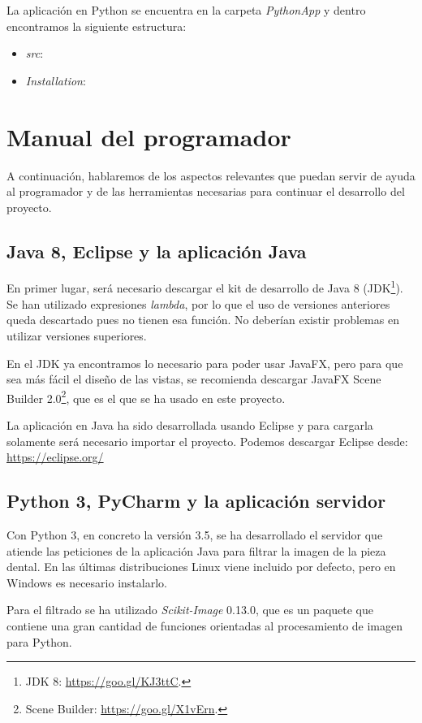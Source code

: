La aplicación en Python se encuentra en la carpeta \textit{PythonApp} y dentro encontramos la siguiente estructura:
\begin{itemize}
    \item \textit{src}:
    \item \textit{Installation}:
\end{itemize}

\section{Manual del programador}
A continuación, hablaremos de los aspectos relevantes que puedan servir de ayuda al programador y de las herramientas necesarias para continuar el desarrollo del proyecto.

\subsection{Java 8, Eclipse y la aplicación Java}
En primer lugar, será necesario descargar el kit de desarrollo de Java 8 (JDK\footnote{JDK 8: \url{https://goo.gl/KJ3ttC}.}). Se han utilizado expresiones \textit{lambda}, por lo que el uso de versiones anteriores queda descartado pues no tienen esa función. No deberían existir problemas en utilizar versiones superiores. 

En el JDK ya encontramos lo necesario para poder usar JavaFX, pero para que sea más fácil el diseño de las vistas, se recomienda descargar JavaFX Scene Builder 2.0\footnote{Scene Builder: \url{https://goo.gl/X1vErn}.}, que es el que se ha usado en este proyecto. 

La aplicación en Java ha sido desarrollada usando Eclipse y para cargarla solamente será necesario importar el proyecto. Podemos descargar Eclipse desde: \\
\url{https://eclipse.org/}

\subsection{Python 3, PyCharm y la aplicación servidor}
Con Python 3, en concreto la versión 3.5, se ha desarrollado el servidor que atiende las peticiones de la aplicación Java para filtrar la imagen de la pieza dental. En las últimas distribuciones Linux viene incluido por defecto, pero en Windows es necesario instalarlo.

Para el filtrado se ha utilizado \textit{Scikit-Image} 0.13.0, que es un paquete que contiene una gran cantidad de funciones orientadas al procesamiento de imagen para Python. 

